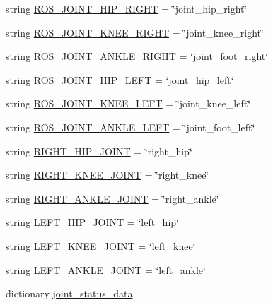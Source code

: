\begin{DoxyCompactItemize}
\item 
string \mbox{\hyperlink{namespacevelocity__test_ada688e57f19532636c56960634fa8c40}{R\+O\+S\+\_\+\+J\+O\+I\+N\+T\+\_\+\+H\+I\+P\+\_\+\+R\+I\+G\+HT}} = \char`\"{}joint\+\_\+hip\+\_\+right\char`\"{}
\item 
string \mbox{\hyperlink{namespacevelocity__test_a341ef55c2d279578af17efe8637ddd03}{R\+O\+S\+\_\+\+J\+O\+I\+N\+T\+\_\+\+K\+N\+E\+E\+\_\+\+R\+I\+G\+HT}} = \char`\"{}joint\+\_\+knee\+\_\+right\char`\"{}
\item 
string \mbox{\hyperlink{namespacevelocity__test_ac17433d39b722537abc908a86e6ea99a}{R\+O\+S\+\_\+\+J\+O\+I\+N\+T\+\_\+\+A\+N\+K\+L\+E\+\_\+\+R\+I\+G\+HT}} = \char`\"{}joint\+\_\+foot\+\_\+right\char`\"{}
\item 
string \mbox{\hyperlink{namespacevelocity__test_a3a973375089949e40ace5139a851cedb}{R\+O\+S\+\_\+\+J\+O\+I\+N\+T\+\_\+\+H\+I\+P\+\_\+\+L\+E\+FT}} = \char`\"{}joint\+\_\+hip\+\_\+left\char`\"{}
\item 
string \mbox{\hyperlink{namespacevelocity__test_a7f0880da1f093ba95faeec7806a42256}{R\+O\+S\+\_\+\+J\+O\+I\+N\+T\+\_\+\+K\+N\+E\+E\+\_\+\+L\+E\+FT}} = \char`\"{}joint\+\_\+knee\+\_\+left\char`\"{}
\item 
string \mbox{\hyperlink{namespacevelocity__test_a8cd4a0f4646759c98455ab588430e2a5}{R\+O\+S\+\_\+\+J\+O\+I\+N\+T\+\_\+\+A\+N\+K\+L\+E\+\_\+\+L\+E\+FT}} = \char`\"{}joint\+\_\+foot\+\_\+left\char`\"{}
\item 
string \mbox{\hyperlink{namespacevelocity__test_a6d042ad31d4dd8b1196944ddd3f183dc}{R\+I\+G\+H\+T\+\_\+\+H\+I\+P\+\_\+\+J\+O\+I\+NT}} = \char`\"{}right\+\_\+hip\char`\"{}
\item 
string \mbox{\hyperlink{namespacevelocity__test_aac10175d78187fb4808713f5360621e6}{R\+I\+G\+H\+T\+\_\+\+K\+N\+E\+E\+\_\+\+J\+O\+I\+NT}} = \char`\"{}right\+\_\+knee\char`\"{}
\item 
string \mbox{\hyperlink{namespacevelocity__test_a9a87ce10dc7e9c95212b9394d3abc94d}{R\+I\+G\+H\+T\+\_\+\+A\+N\+K\+L\+E\+\_\+\+J\+O\+I\+NT}} = \char`\"{}right\+\_\+ankle\char`\"{}
\item 
string \mbox{\hyperlink{namespacevelocity__test_a72b898fa35ef82136e0f848309730045}{L\+E\+F\+T\+\_\+\+H\+I\+P\+\_\+\+J\+O\+I\+NT}} = \char`\"{}left\+\_\+hip\char`\"{}
\item 
string \mbox{\hyperlink{namespacevelocity__test_a456e70c0db66db9da24b1af04763749d}{L\+E\+F\+T\+\_\+\+K\+N\+E\+E\+\_\+\+J\+O\+I\+NT}} = \char`\"{}left\+\_\+knee\char`\"{}
\item 
string \mbox{\hyperlink{namespacevelocity__test_a6a8b8efc455f4e0b1bea0fcdd5fd576d}{L\+E\+F\+T\+\_\+\+A\+N\+K\+L\+E\+\_\+\+J\+O\+I\+NT}} = \char`\"{}left\+\_\+ankle\char`\"{}
\item 
dictionary \mbox{\hyperlink{namespacevelocity__test_adedb8acaa09e634a0127c67ad61a001b}{joint\+\_\+status\+\_\+data}}
\end{DoxyCompactItemize}


